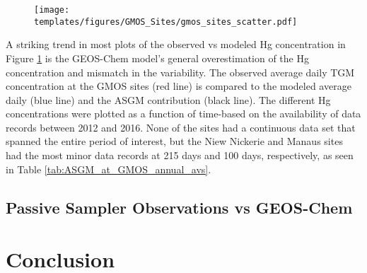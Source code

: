 \begin{flushleft}
  \begin{figure}[H]
\texttt{[image: templates/figures/GMOS\_Sites/gmos\_sites\_scatter.pdf]}
\centering
{}
\label{fig:gmos_sites_scatter}
\end{figure}
\FloatBarrier
\end{flushleft}

\begin{flushleft}
A striking trend in most plots of the observed vs modeled Hg concentration in Figure \ref{fig:gmos_sites_scatter} is the GEOS-Chem model's general overestimation of the Hg concentration and mismatch in the variability. The observed average daily TGM concentration at the GMOS sites (red line) is compared to the modeled \on average daily \hg (blue line) and the ASGM contribution (black line). The different Hg concentrations were plotted as a function of time-based on the availability of data records between 2012 and 2016. None of the sites had a continuous data set that spanned the entire period of interest, but the Niew Nickerie and Manaus sites had the most minor data records at 215 days and 100 days, respectively, as seen in Table \ref{tab:ASGM_at_GMOS_annual_avs}.   
\end{flushleft}

\begin{flushleft}
 
\end{flushleft}


\subsection{Passive Sampler Observations vs GEOS-Chem}


\begin{flushleft}


\end{flushleft}











\section{Conclusion}

